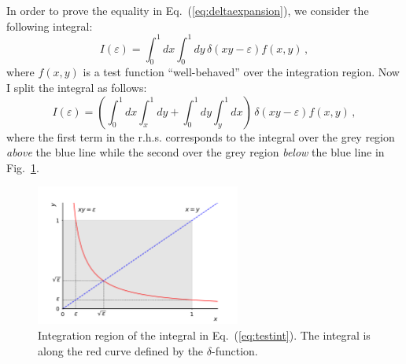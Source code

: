 \documentclass[10pt,a4paper]{article}
\begin{document}
In order to prove the equality in Eq.~(\ref{eq:deltaexpansion}), we
consider the following integral:
\begin{equation}\label{eq:testint}
I(\varepsilon) =\int_0^1 dx \int_0^1 dy\,\delta(xy-\varepsilon) f(x,y)\,,
\end{equation}
where $f(x,y)$ is a test function ``well-behaved'' over the
integration region. Now I split the integral as follows:
\begin{equation}
I(\varepsilon) =\left(\int_0^1 dx \int_x^1 dy+\int_0^1 dy \int_y^1 dx\right)\,\delta(xy-\varepsilon) f(x,y)\,,
\end{equation}
where the first term in the r.h.s. corresponds to the integral over
the grey region \textit{above} the blue line while the second over the
grey region \textit{below} the blue line in
Fig.~\ref{fig:deltaexpansion}.
\begin{figure}[t]
  \begin{centering}
    \includegraphics[width=0.6\textwidth]{../plots/DeltaExpansion}
    \caption{Integration region of the integral in 
      Eq.~(\ref{eq:testint}). The integral is along the red curve 
      defined by the $\delta$-function.\label{fig:deltaexpansion}}
  \end{centering}
\end{figure}
\end{document}
